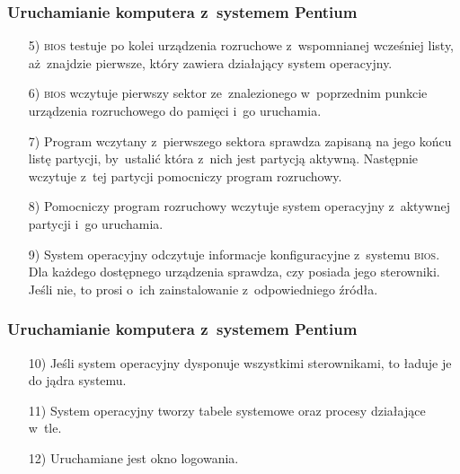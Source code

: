 \documentclass[10pt,t]{beamer}
\begin{document}
\begin{frame}
  \frametitle{Uruchamianie komputera z~systemem Pentium}


  \begin{itemize}

  \item[5)] \textsc{bios} testuje po kolei urządzenia rozruchowe
    z~wspomnianej wcześniej listy, aż~znajdzie pierwsze, który zawiera
    działający system operacyjny.

  \item[6)] \textsc{bios} wczytuje pierwszy sektor ze~znalezionego
    w~poprzednim punkcie urządzenia rozruchowego do pamięci i~go uruchamia.

  \item[7)] Program wczytany z~pierwszego sektora sprawdza zapisaną na jego
    końcu listę partycji, by~ustalić która z~nich jest partycją aktywną.
    Następnie wczytuje z~tej partycji pomocniczy program rozruchowy.

  \item[8)] Pomocniczy program rozruchowy wczytuje system operacyjny
    z~aktywnej partycji i~go uruchamia.

  \item[9)] System operacyjny odczytuje informacje konfiguracyjne z~systemu
    \textsc{bios}. Dla każdego dostępnego urządzenia sprawdza, czy posiada
    jego sterowniki. Jeśli nie, to prosi o~ich zainstalowanie
    z~odpowiedniego źródła.

  \end{itemize}

\end{frame}





\begin{frame}
  \frametitle{Uruchamianie komputera z~systemem Pentium}


  \begin{itemize}

  \item[10)] Jeśli system operacyjny dysponuje wszystkimi sterownikami,
    to ładuje je do jądra systemu.

  \item[11)] System operacyjny tworzy tabele systemowe oraz procesy
    działające w~tle.

  \item[12)] Uruchamiane jest okno logowania.

  \end{itemize}

\end{frame}
\end{document}

